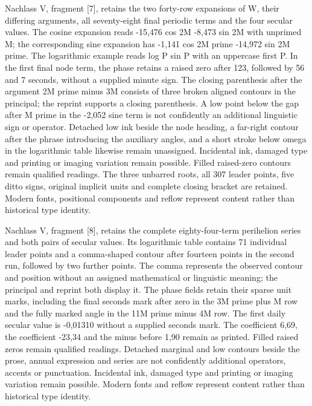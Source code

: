Nachlass V, fragment [7], retains the two forty-row expansions of W, their differing arguments, all seventy-eight final periodic terms and the four secular values. The cosine expansion reads -15,476 cos 2M -8,473 sin 2M with unprimed M; the corresponding sine expansion has -1,141 cos 2M prime -14,972 sin 2M prime. The logarithmic example reads log P sin P with an uppercase first P. In the first final node term, the phase retains a raised zero after 123, followed by 56 and 7 seconds, without a supplied minute sign. The closing parenthesis after the argument 2M prime minus 3M consists of three broken aligned contours in the principal; the reprint supports a closing parenthesis. A low point below the gap after M prime in the -2,052 sine term is not confidently an additional linguistic sign or operator. Detached low ink beside the node heading, a far-right contour after the phrase introducing the auxiliary angles, and a short stroke below omega in the logarithmic table likewise remain unassigned. Incidental ink, damaged type and printing or imaging variation remain possible. Filled raised-zero contours remain qualified readings. The three unbarred roots, all 307 leader points, five ditto signs, original implicit units and complete closing bracket are retained. Modern fonts, positional components and reflow represent content rather than historical type identity.

Nachlass V, fragment [8], retains the complete eighty-four-term perihelion series and both pairs of secular values. Its logarithmic table contains 71 individual leader points and a comma-shaped contour after fourteen points in the second run, followed by two further points. The comma represents the observed contour and position without an assigned mathematical or linguistic meaning; the principal and reprint both display it. The phase fields retain their sparse unit marks, including the final seconds mark after zero in the 3M prime plus M row and the fully marked angle in the 11M prime minus 4M row. The first daily secular value is -0,01310 without a supplied seconds mark. The coefficient 6,69, the coefficient -23,34 and the minus before 1,90 remain as printed. Filled raised zeros remain qualified readings. Detached marginal and low contours beside the prose, annual expression and series are not confidently additional operators, accents or punctuation. Incidental ink, damaged type and printing or imaging variation remain possible. Modern fonts and reflow represent content rather than historical type identity.

